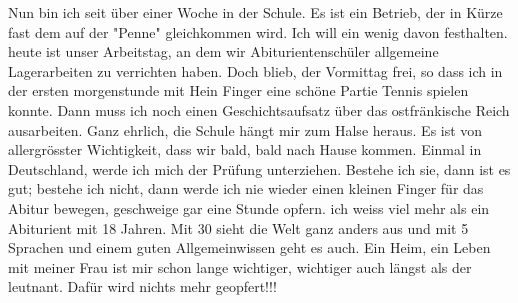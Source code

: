 \def\day{8. Juni 1943}
\mktitle

Nun bin ich seit \"{u}ber einer Woche in der Schule.
Es ist ein Betrieb, der in K\"{u}rze fast dem auf der "Penne" gleichkommen wird.
Ich will ein wenig davon festhalten.
heute ist unser Arbeitstag, an dem wir Abiturientensch\"{u}ler allgemeine Lagerarbeiten zu verrichten haben.
Doch blieb, der Vormittag frei, so dass ich in der ersten morgenstunde mit Hein Finger eine sch\"{o}ne Partie Tennis spielen konnte.
Dann muss ich noch einen Geschichtsaufsatz \"{u}ber das ostfr\"{a}nkische Reich ausarbeiten.
Ganz ehrlich, die Schule h\"{a}ngt mir zum Halse heraus.
Es ist von allergr\"{o}sster Wichtigkeit, dass wir bald, bald nach Hause kommen.
Einmal in Deutschland, werde ich mich der Pr\"{u}fung unterziehen.
Bestehe ich sie, dann ist es gut; bestehe ich nicht, dann werde ich nie wieder einen kleinen Finger f\"{u}r das Abitur bewegen, geschweige gar eine Stunde opfern.
ich weiss viel mehr als ein Abiturient mit 18 Jahren.
Mit 30 sieht die Welt ganz anders aus und mit 5 Sprachen und einem guten Allgemeinwissen geht es auch.
Ein Heim, ein Leben mit meiner Frau ist mir schon lange wichtiger, wichtiger auch l\"{a}ngst als der leutnant.
Daf\"{u}r wird nichts mehr geopfert!!!

\clearpage
